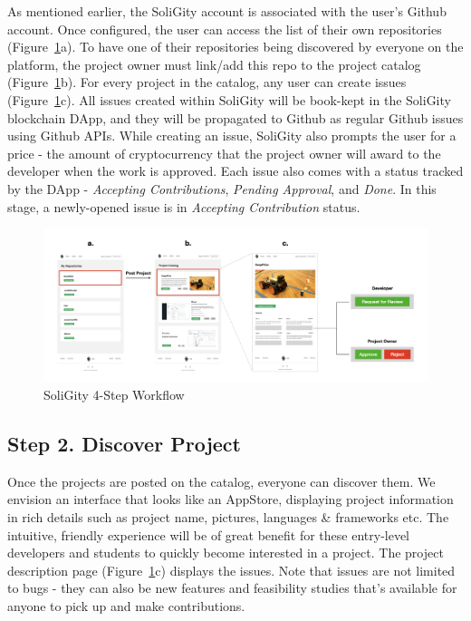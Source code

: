 \documentclass[12pt]{article}
\renewcommand{\_}{\kern-1.5pt\textunderscore\kern-1.5pt}
\begin{document}
As mentioned earlier, the SoliGity account is associated with the user’s Github account. Once configured, the user can access the list of their own repositories (Figure~\ref{fig:workflow2}a). To have one of their repositories being discovered by everyone on the platform, the project owner must link/add this repo to the project catalog (Figure~\ref{fig:workflow2}b). For every project in the catalog, any user can create issues (Figure~\ref{fig:workflow2}c). All issues created within SoliGity will be book-kept in the SoliGity blockchain DApp, and they will be propagated to Github as regular Github issues using Github APIs. While creating an issue, SoliGity also prompts the user for a price - the amount of cryptocurrency that the project owner will award to the developer when the work is approved. Each issue also comes with a status tracked by the DApp - \textit{Accepting Contributions}, \textit{Pending Approval}, and \textit{Done}. In this stage, a newly-opened issue is in \textit{Accepting Contribution} status.


\begin{figure}[h]
	\centering
	\includegraphics[width=16.5cm]{graphs/00b. workflow.jpeg}
	\caption{SoliGity 4-Step Workflow}
	\label{fig:workflow2}
\end{figure}

\subsection*{Step 2. Discover Project}

Once the projects are posted on the catalog, everyone can discover them. We envision an interface that looks like an AppStore, displaying project information in rich details such as project name, pictures, languages \& frameworks etc. The intuitive, friendly experience will be of great benefit for these entry-level developers and students to quickly become interested in a project. The project description page (Figure~\ref{fig:workflow2}c) displays the issues. Note that issues are not limited to bugs - they can also be new features and feasibility studies that’s available for anyone to pick up and make contributions.
\end{document}
